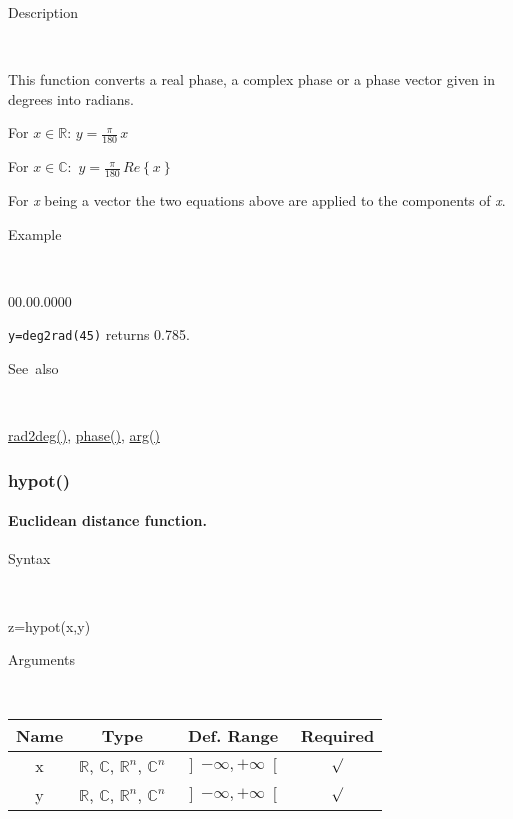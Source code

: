 \begin{description}
\item [Description]~
\end{description}
This function converts a real phase, a complex phase or a phase vector
given in degrees into radians. 

\medskip{}
For $x\in\mathbb{R}$: $y={\displaystyle \frac{\pi}{180}}\, x$
\medskip{}

For $x\mathbb{\mathbb{\in C}}:$ $y={\displaystyle \frac{\pi}{180}}\, Re\left\{ x\right\} $
\medskip{}

For \textit{x} being a vector the two equations above are
applied to the components of \textit{x}.

\begin{description}
\item [Example]~
\end{description}
\begin{lyxlist}{00.00.0000}
\item [\texttt{y=deg2rad(45)}]returns 0.785.
\end{lyxlist}
\begin{description}
\item [See~also]~
\end{description}
\textcolor{blue}{\hyperlink{rad2deg}{rad2deg()}}, \textcolor{blue}{\hyperlink{phase}{phase()}},
\textcolor{blue}{\hyperlink{arg}{arg()}}


\newpage
\subsubsection*{\hypertarget{hypot}{}{\Large hypot()}}

\paragraph{\label{par:hypot}Euclidean distance function.}

\begin{description}
\item [Syntax]~
\end{description}
z=hypot(x,y)

\begin{description}
\item [Arguments]~
\end{description}
\begin{tabular}{|c|c|c|c|}
\hline 
Name&
Type&
Def. Range&
Required\tabularnewline
\hline
\hline 
x&
$\mathbb{R}$, $\mathbb{C}$, $\mathbb{R}^{n}$, $\mathbb{C}^{n}$&
$\left]-\infty,+\infty\right[$&
$\surd$\tabularnewline
\hline
y&
$\mathbb{R}$, $\mathbb{C}$, $\mathbb{R}^{n}$, $\mathbb{C}^{n}$&
$\left]-\infty,+\infty\right[$&
$\surd$\tabularnewline
\hline
\end{tabular}

